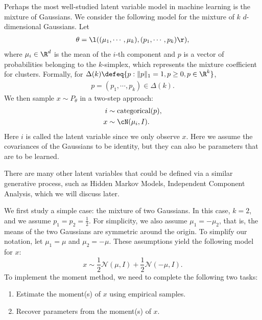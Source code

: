 Perhaps the most well-studied latent variable model in machine learning is the mixture of Gaussians. We consider the following model for the mixture of $k$ $d$-dimensional Gaussians. Let 
\begin{align}
\theta = \l ( (\mu_1, \cdots, \mu_k), (p_1, \cdots, p_k)\r ),
\end{align}
where $\mu_i\in \R^d$ is the mean of the $i$-th component and $p$ is a vector of probabilities belonging to the $k$-simplex, which represents the mixture coefficient for clusters. Formally, for $\Delta(k) \defeq \{ p: \|p\|_1 = 1, p\geq 0, p\in\R^k\}$, 
\begin{align}
    p = (p_1, \cdots, p_k) \in \Delta(k).
\end{align}
We then sample $x \sim P_\theta$ in a two-step approach: 
\begin{align}
    i &\sim \text{categorical}(p), \notag\\
    x &\sim \cN(\mu_i, I).
\end{align}
Here $i$ is called the latent variable since we only observe $x$. Here we assume the covariances of the Gaussians to be identity, but they can also be parameters that are to be learned.

There are many other latent variables that could be defined via a similar generative process, such as Hidden Markov Models, Independent Component Analysis, which we will discuss later. %

We first study a simple case: the mixture of two Gaussians.
In this case, $k=2$, and we assume $p_1=p_2=\frac{1}{2}$. For simplicity, we also assume $\mu_1=-\mu_2$, that is, the means of the two Gaussians are symmetric around the origin. To simplify our notation, let $\mu_1=\mu$ and $\mu_2=-\mu$. These assumptions yield the following model for $x$:
\begin{equation}
    x \sim \frac{1}{2}\mathcal{N}(\mu,I) + \frac{1}{2}\mathcal{N}(-\mu,I).
\end{equation}
To implement the moment method, we need to complete the following two tasks:
\begin{enumerate}
    \item Estimate the moment(s) of $x$ using empirical samples.
    \item Recover parameters from the moment(s) of $x$.
\end{enumerate}

